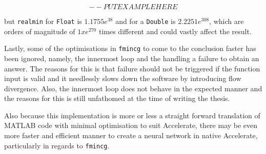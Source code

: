 $$-- PUT EXAMPLE HERE$$

but \texttt{realmin} for \texttt{Float} is $1.1755e^{38}$ and for a \texttt{Double} is $2.2251e^{308}$, which are orders of magnitude of $1xe^{270}$ times different and could vastly affect the result.

Lastly, some of the optimisations in \texttt{fmincg} to come to the conclusion faster has been ignored, namely, the innermost loop and the handling a failure to obtain an answer. The reasons for this is that failure should not be triggered if the function input is valid and it needlessly slows down the software by introducing flow divergence. Also, the innermost loop does not behave in the expected manner and the reasons for this is still unfathomed at the time of writing the thesis.

Also because this implementation is more or less a straight forward translation of MATLAB code with minimal optimisation to suit Accelerate, there may be even more faster and efficient manner to create a neural network in native Accelerate, particularly in regards to \texttt{fmincg}.